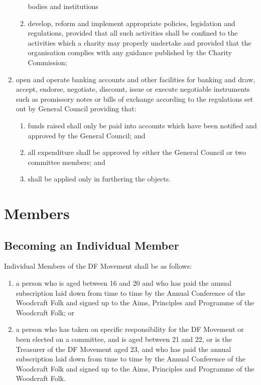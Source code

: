 \documentclass[a4paper, 11pt]{report}
\begin{document}
\begin{enumerate}
\begin{enumerate}
bodies and institutions
\item develop, reform and implement appropriate policies, legislation and regulations, provided that all such activities shall be confined to the activities which a charity may properly undertake and provided that the organisation complies with any guidance published by the Charity Commission;
\end{enumerate}
\item open and operate banking accounts and other facilities for banking and draw,
accept, endorse, negotiate, discount, issue or execute negotiable instruments such
as promissory notes or bills of exchange according to the regulations set out by
General Council providing that:
\begin{enumerate}
\item funds raised shall only be paid into accounts which have been notified and
approved by the General Council; and
\item all expenditure shall be approved by either the General Council or two committee
members; and
\item shall be applied only in furthering the objects.
\end{enumerate}
\end{enumerate}

\section{Members}
\label{sec:members}
\subsection{Becoming an Individual Member}
\label{sec:indivmembers}
Individual Members of the DF Movement shall be as follows:
\begin{enumerate}[\hspace{0.5cm}(a)]
\item \label{item:normalmember} a person who is aged between 16 and 20 and who has paid the annual subscription laid down from time to time by the Annual Conference of the Woodcraft Folk and signed up to the Aims, Principles and Programme of the Woodcraft Folk; or
\item  \label{item:greyarea} a person who has taken on specific responsibility for the DF Movement or been elected on a committee, and is aged between 21 and 22, or is the Treasurer of the DF Movement aged 23, and who has paid the annual subscription laid down from time to time by the Annual Conference of the Woodcraft Folk and signed up to the Aims, Principles and Programme of the Woodcraft Folk.
\end{enumerate}
\end{document}
